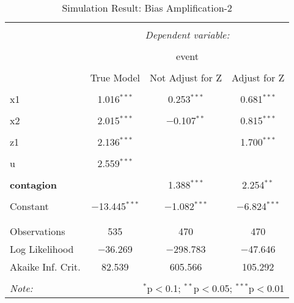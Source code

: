\documentclass[11pt]{article}
\begin{document}
\begin{table}[!htbp] \centering 
  \caption{Simulation Result: Bias Amplification-2} 
  \label{} 
\begin{tabular}{@{\extracolsep{5pt}}lccc} 
\\[-1.8ex]\hline 
\hline \\[-1.8ex] 
 & \multicolumn{3}{c}{\textit{Dependent variable:}} \\ 
\cline{2-4} 
\\[-1.8ex] & \multicolumn{3}{c}{event} \\ 
\\[-1.8ex] & True Model & Not Adjust for Z & Adjust for Z\\ 
\hline \\[-1.8ex] 
 x1 & 1.016$^{***}$ & 0.253$^{***}$ & 0.681$^{***}$ \\ 
  & & & \\ 
 x2 & 2.015$^{***}$ & $-$0.107$^{**}$ & 0.815$^{***}$ \\ 
  & & & \\ 
 z1 & 2.136$^{***}$ &  & 1.700$^{***}$ \\ 
  & & & \\ 
 u & 2.559$^{***}$ &  &  \\ 
  & & & \\ 
\textbf{contagion} &  & 1.388$^{***}$ & 2.254$^{**}$ \\ 
  & & & \\ 
 Constant & $-$13.445$^{***}$ & $-$1.082$^{***}$ & $-$6.824$^{***}$ \\ 
  & & & \\ 
\hline \\[-1.8ex] 
Observations & 535 & 470 & 470 \\ 
Log Likelihood & $-$36.269 & $-$298.783 & $-$47.646 \\ 
Akaike Inf. Crit. & 82.539 & 605.566 & 105.292 \\ 
\hline 
\hline \\[-1.8ex] 
\textit{Note:}  & \multicolumn{3}{r}{$^{*}$p$<$0.1; $^{**}$p$<$0.05; $^{***}$p$<$0.01} \\ 
\end{tabular} 
\end{table} 
\end{document}
